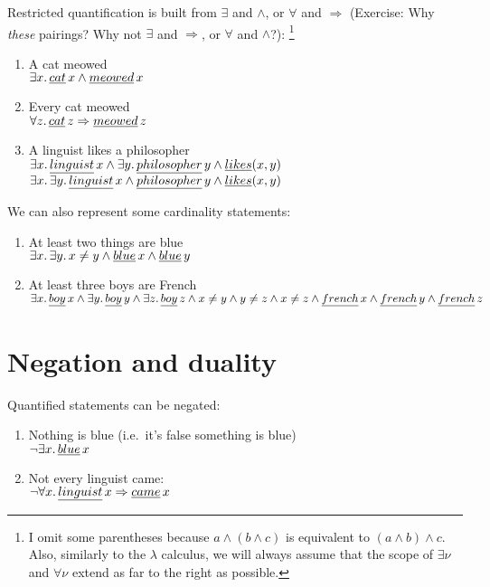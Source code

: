 \documentclass{article}
\newcommand{\Ra}{\Rightarrow}
\begin{document}
Restricted quantification is built from $\exists$ and $\wedge$, or $\forall$ and
$\Ra$ (Exercise: Why \emph{these} pairings? Why not $\exists$ and $\Ra$, or
$\forall$ and $\wedge$?):%
\footnote{%
\label{fn}%
  I omit some parentheses because $a \wedge (b \wedge c)$ is equivalent to $(a
  \wedge b) \wedge c$. Also, similarly to the $\lambda$ calculus, we will always
  assume that the scope of $\exists \nu$ and $\forall \nu$ extend as far to the
  right as possible.
}
\begin{enumerate}
  \item
    A cat meowed
    \\
    $\exists x.\,\emph{cat}\,x \wedge \emph{meowed}\,x$

  \item
    Every cat meowed
    \\
    $\forall z.\, \emph{cat}\,z \Ra \emph{meowed}\,z$

  \item
    A linguist likes a philosopher
    \\
    $\exists x.\,\emph{linguist}\,x \wedge \exists y.\, \emph{philosopher}\,y
    \wedge \emph{likes}(x,y)$
    \\
    $\exists x.\,\exists y.\,\emph{linguist}\,x \wedge \emph{philosopher}\,y
    \wedge \emph{likes}(x,y)$    
\end{enumerate}

We can also represent some cardinality statements:
\begin{enumerate}
  \item
    At least two things are blue
    \\
    $\exists x.\,\exists y.\,x \neq y \wedge \emph{blue}\,x \wedge
    \emph{blue}\,y$

  \item
    At least three boys are French
    \\
    $\exists x.\,\emph{boy}\,x \wedge \exists y.\, \emph{boy}\,y \wedge \exists z.\,
    \emph{boy}\,z \wedge x \neq y \wedge y \neq z \wedge x \neq z \wedge
    \emph{french}\,x \wedge \emph{french}\,y \wedge \emph{french}\,z$
\end{enumerate}

\section{Negation and duality}

Quantified statements can be negated:
\begin{enumerate}
  \item
    Nothing is blue (i.e.~it's false something is blue)
    \\
    $\neg\exists x.\, \emph{blue}\,x$

  \item
    Not every linguist came:
    \\
    $\neg\forall x.\,\emph{linguist}\,x \Ra \emph{came}\,x$
\end{enumerate}
\end{document}
